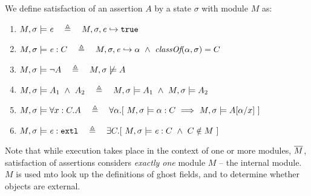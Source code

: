 \begin{definition} 
\label{def:chainmail-semantics}
We define satisfaction of an assertion $A$ by a %
state $\sigma$ with 
 module $M$ as:
\begin{enumerate}
\item
\label{cExpr}
$\satisfiesA{M}{\sigma}{{\re}}\ \ \ \triangleq \ \ \   \eval{M}{\sigma}{{\re}}{\true}$
\item
\label{cClass}
$M , \sigma \models {{\mathit{e}}} : C\ \ \ \triangleq \ \ \   M, \sigma, {\mathit{e}} \hookrightarrow \alpha\   \wedge \ \textit{classOf}(\alpha, \sigma)= C$
\item
$\satisfiesA{M}{\sigma}{\neg A}\ \ \ \triangleq \ \ \   {M},{\sigma}\not\models{A}$
\item
$\satisfiesA{M}{\sigma}{A_1\ \wedge\ A_2}\ \ \ \triangleq \ \ \   \satisfiesA{M}{\sigma}{A_1} \   \wedge \ \satisfiesA{M}{\sigma}{A_2}$

\item
\label{quant1}
$\satisfiesA{M}{\sigma}{\all{x:C}{A}} \ \ \ \triangleq \ \ \   
\forall \alpha.[\   \satisfiesA {M}{\sigma} {\alpha:C}  \ \Longrightarrow   \ \satisfiesA{M}{\sigma} {A[\alpha/x]} \ ] $

\item
\label{cExternal}
$\satisfiesA{M}{\sigma}{\external{{\re}}} \ \ \ \triangleq \ \ \  \exists C.[\ \satisfiesA{M}{\sigma}{{{\re}} : C} \ \wedge \ C \notin M \ ]$
\end{enumerate}
\end{definition}

 
Note that while execution takes place in the context of one or more modules, $\overline{M}$, satisfaction of assertions considers \emph{exactly one} module  $M$ -- the internal module. 
{$M$} is used  mto look up the definitions of ghost fields, and to %
 determine whether objects are  external.

